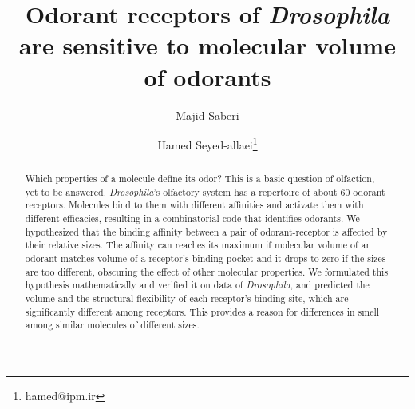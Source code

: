 \documentclass[11pt]{paper} %
\title{Odorant receptors of \textit{Drosophila} are sensitive to molecular volume of odorants}
\author{Majid Saberi \and Hamed Seyed-allaei\thanks{hamed@ipm.ir}}
\begin{document}

\maketitle

\begin{abstract} 
Which properties of a molecule define its odor? This is a basic question of olfaction, 
yet to be answered. \textit{Drosophila}'s olfactory system has a repertoire of about 60 odorant receptors. 
Molecules bind to them with different affinities and activate them with different efficacies, 
resulting in a combinatorial code that identifies odorants. 
We hypothesized that the binding affinity between a pair of odorant-receptor is affected by their relative sizes. 
The affinity can reaches its maximum if molecular volume of an odorant matches volume of a receptor's binding-pocket 
and it drops to zero if the sizes are too different, 
obscuring the effect of other molecular properties. 
We formulated this hypothesis mathematically and verified it on data of \textit{Drosophila}, 
and predicted the volume and the structural flexibility of each receptor's binding-site, 
which are significantly different among receptors. 
This provides a reason for differences in smell among similar molecules of different sizes. 
\end{abstract}



\end{document}
